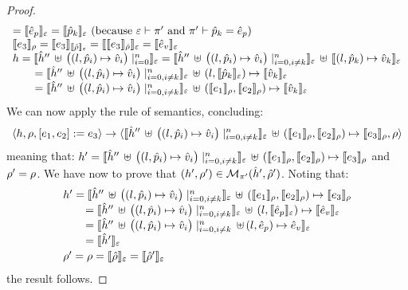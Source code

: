 \begin{proof}
$$\begin{array}{l}
   =  \symbeval{\sexpr_p}{\senv} = \symbeval{\sexprp_k}{\senv}  \text{ (because $\senv \vdash \pc'$ and $\pc' \vdash \sexprp_k = \sexpr_p$)} \\
  \symbeval{\jsilexpr_3}{\store}  = \symbeval{\jsilexpr_3}{\semexpr{\sstore}{\senv}} =  \symbeval{\symbeval{\jsilexpr_3}{\sstore}}{\senv}
   =  \symbeval{\sexpr_v}{\senv} \\
 \heap = \semexpr{\sheap'' \, \uplus \, \big((l, \sexprp_i) \mapsto \sexprv_i\big)\mid_{i = 0}^n}{\senv} 
       =  \semexpr{\sheap'' \, \uplus \, \big((l, \sexprp_i) \mapsto \sexprv_i\big)\mid_{i = 0, i \neq k}^n}{\senv} \dunion \semexpr{(l, \sexprp_k) \mapsto \sexprv_k}{\senv} \\
         \qquad = \semexpr{\sheap'' \, \uplus \, \big((l, \sexprp_i) \mapsto \sexprv_i\big)\mid_{i = 0, i \neq k}^n}{\senv} \dunion (l, \semexpr{\sexprp_k}{\senv}) \mapsto \semexpr{\sexprv_k}{\senv}  \\ 
         \qquad =  \semexpr{\sheap'' \, \uplus \, \big((l, \sexprp_i) \mapsto \sexprv_i\big)\mid_{i = 0, i \neq k}^n}{\senv} \dunion (\symbeval{\jsilexpr_1}{\store}, \symbeval{\jsilexpr_2}{\store}) \mapsto \semexpr{\sexprv_k}{\senv} \\ 
\end{array}
$$
We can now apply the  rule of \jsil semantics, concluding: 
$$
   \semtrans{\heap, \store, [\jsilexpr_1, \jsilexpr_2] := \jsilexpr_3}
     {\semexpr{\sheap'' \, \uplus \, \big((l, \sexprp_i) \mapsto \sexprv_i\big)\mid_{i = 0, i \neq k}^n}{\senv} \dunion (\symbeval{\jsilexpr_1}{\store}, \symbeval{\jsilexpr_2}{\store}) \mapsto \symbeval{\jsilexpr_3}{\store},  \store}
$$
meaning that: 
$\heap' = \symbeval{\sheap'' \, \uplus \, \big((l, \sexprp_i) \mapsto \sexprv_i\big)\mid_{i = 0, i \neq k}^n}{\senv} \dunion (\symbeval{\jsilexpr_1}{\store}, \symbeval{\jsilexpr_2}{\store}) \mapsto \symbeval{\jsilexpr_3}{\store}$ and 
$\store' = \store$.
We have now to prove that $(\heap', \store') \in \smodels{\sheap', \sstore'}{\pc'}$.
Noting that:
$$
\begin{array}{l}
\heap' = \symbeval{\sheap'' \, \uplus \, \big((l, \sexprp_i) \mapsto \sexprv_i\big)\mid_{i = 0, i \neq k}^n}{\senv} \dunion (\symbeval{\jsilexpr_1}{\store}, \symbeval{\jsilexpr_2}{\store}) \mapsto \symbeval{\jsilexpr_3}{\store} \\ 
  \qquad = \symbeval{\sheap'' \, \uplus \, \big((l, \sexprp_i) \mapsto \sexprv_i\big)\mid_{i = 0, i \neq k}^n}{\senv} \dunion (\loc, \symbeval{\sexpr_p}{\senv}) \mapsto \symbeval{\sexpr_v}{\senv}  \\
    \qquad = \symbeval{\sheap'' \, \uplus \, \big((l, \sexprp_i) \mapsto \sexprv_i\big)\mid_{i = 0, i \neq k}^n \dunion (\loc, \sexpr_p) \mapsto \sexpr_v}{\senv}  \\
    \qquad = \symbeval{\sheap'}{\senv} \\[2pt]
 \store' = \store = \symbeval{\sstore}{\senv} = \symbeval{\sstore'}{\senv} 
\end{array}
$$
the result follows. 
\vspace{6pt}


\end{proof}
